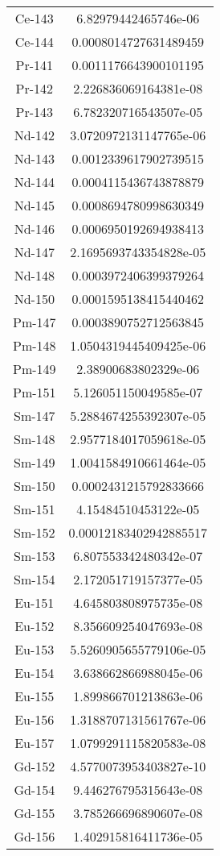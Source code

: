 \begin{table}[h!]
\begin{tabular}{|| c || c |}
Ce-143 & 6.82979442465746e-06 \\
Ce-144 & 0.0008014727631489459 \\
Pr-141 & 0.0011176643900101195 \\
Pr-142 & 2.226836069164381e-08 \\
Pr-143 & 6.782320716543507e-05 \\
Nd-142 & 3.0720972131147765e-06 \\
Nd-143 & 0.0012339617902739515 \\
Nd-144 & 0.0004115436743878879 \\
Nd-145 & 0.0008694780998630349 \\
Nd-146 & 0.0006950192694938413 \\
Nd-147 & 2.1695693743354828e-05 \\
Nd-148 & 0.0003972406399379264 \\
Nd-150 & 0.0001595138415440462 \\
Pm-147 & 0.0003890752712563845 \\
Pm-148 & 1.0504319445409425e-06 \\
Pm-149 & 2.38900683802329e-06 \\
Pm-151 & 5.126051150049585e-07 \\
Sm-147 & 5.2884674255392307e-05 \\
Sm-148 & 2.9577184017059618e-05 \\
Sm-149 & 1.0041584910661464e-05 \\
Sm-150 & 0.0002431215792833666 \\
Sm-151 & 4.15484510453122e-05 \\
Sm-152 & 0.00012183402942885517 \\
Sm-153 & 6.807553342480342e-07 \\
Sm-154 & 2.172051719157377e-05 \\
Eu-151 & 4.645803808975735e-08 \\
Eu-152 & 8.356609254047693e-08 \\
Eu-153 & 5.5260905655779106e-05 \\
Eu-154 & 3.638662866988045e-06 \\
Eu-155 & 1.899866701213863e-06 \\
Eu-156 & 1.3188707131561767e-06 \\
Eu-157 & 1.0799291115820583e-08 \\
Gd-152 & 4.5770073953403827e-10 \\
Gd-154 & 9.446276795315643e-08 \\
Gd-155 & 3.785266696890607e-08 \\
Gd-156 & 1.402915816411736e-05 \\

\end{tabular}
\end{table}

